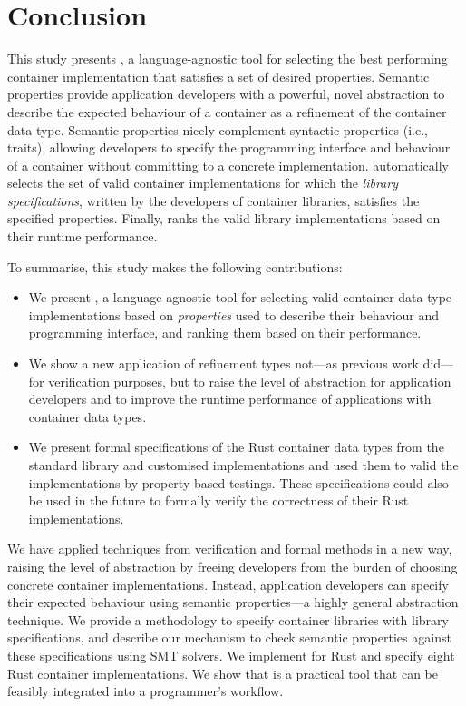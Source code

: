 \section{Conclusion}
\label{chap2:conclusion}
This study presents \Primrose{}, a language-agnostic tool for selecting the best performing container implementation that satisfies a set of desired properties.
Semantic properties provide application developers with a powerful, novel abstraction to describe the expected behaviour of a container as a refinement of the container data type.
Semantic properties nicely complement syntactic properties (i.e., traits), allowing developers to specify the programming interface and behaviour of a container without committing to a concrete implementation.
\Primrose{} automatically selects the set of valid container implementations for which the \emph{library specifications}, written by the developers of container libraries, satisfies the specified properties.
Finally, \Primrose ranks the valid library implementations based on their runtime performance.

To summarise, this study makes the following contributions:
\begin{itemize}
    \item We present \Primrose{}, a language-agnostic tool for selecting valid container data type implementations based on \emph{properties} used to describe their behaviour and programming interface, and ranking them based on their performance.
    \item We show a new application of refinement types not---as previous work did---for verification purposes, but to raise the level of abstraction for application developers and to improve the runtime performance of applications with container data types.
    \item We present formal specifications of the Rust container data types from the standard library and customised implementations and used them to valid the implementations by property-based testings. These specifications could also be used in the future to formally verify the correctness of their Rust implementations.
\end{itemize}

We have applied techniques from verification and formal methods in a new way, raising the level of abstraction by freeing developers from the burden of choosing concrete container implementations.
Instead, application developers can specify their expected behaviour using semantic properties---a highly general abstraction technique.
We provide a methodology to specify container libraries with library specifications, and describe our mechanism to check semantic properties against these specifications using SMT solvers. 
We implement \Primrose{} for Rust and specify eight Rust container implementations. We show that \Primrose{} is a practical tool that can be feasibly integrated into a programmer's workflow.


